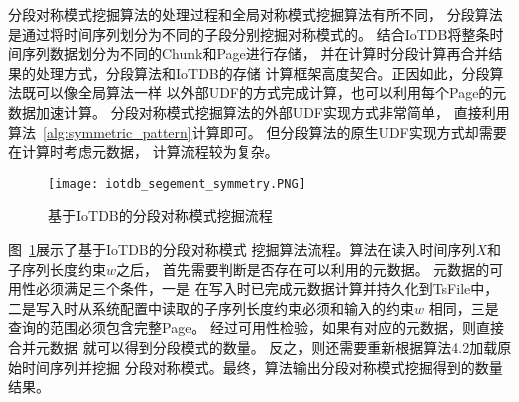 分段对称模式挖掘算法的处理过程和全局对称模式挖掘算法有所不同，
分段算法是通过将时间序列划分为不同的子段分别挖掘对称模式的。
结合IoTDB将整条时间序列数据划分为不同的Chunk和Page进行存储，
并在计算时分段计算再合并结果的处理方式，分段算法和IoTDB的存储
计算框架高度契合。正因如此，分段算法既可以像全局算法一样
以外部UDF的方式完成计算，也可以利用每个Page的元数据加速计算。
分段对称模式挖掘算法的外部UDF实现方式非常简单，
直接利用算法~\ref{alg:symmetric_pattern}计算即可。
但分段算法的原生UDF实现方式却需要在计算时考虑元数据，
计算流程较为复杂。

\begin{figure}
    \centering
    \texttt{[image: iotdb\_segement\_symmetry.PNG]}
    \caption{基于IoTDB的分段对称模式挖掘流程}
    \label{fig:iotdb_segement}
  \end{figure}

图~\ref{fig:iotdb_segement}展示了基于IoTDB的分段对称模式
挖掘算法流程。算法在读入时间序列$X$和子序列长度约束$w$之后，
首先需要判断是否存在可以利用的元数据。
元数据的可用性必须满足三个条件，一是
在写入时已完成元数据计算并持久化到TsFile中，
二是写入时从系统配置中读取的子序列长度约束必须和输入的约束$w$
相同，三是查询的范围必须包含完整Page。
经过可用性检验，如果有对应的元数据，则直接合并元数据
就可以得到分段模式的数量。
反之，则还需要重新根据算法4.2加载原始时间序列并挖掘
分段对称模式。最终，算法输出分段对称模式挖掘得到的数量结果。





